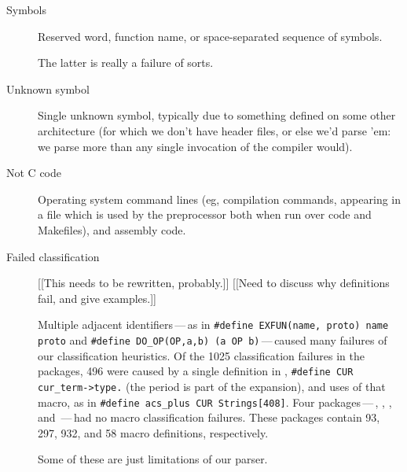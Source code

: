 \begin{description}
\item[Symbols]  Reserved word, function name, or space-separated sequence
of symbols.

The latter is really a failure of sorts.

\item[Unknown symbol]  Single unknown symbol, typically due to something
defined on some other architecture (for which we don't have header files,
or else we'd parse 'em:  we parse more than any single invocation of the
compiler would).


\item[Not C code]  Operating system command lines (eg, compilation
commands, appearing in a file which is used by the preprocessor both when
run over code and Makefiles), and assembly code.







\item[Failed classification]

  [[This needs to be rewritten, probably.]]
  [[Need to discuss why definitions fail, and give examples.]]

  Multiple adjacent identifiers\,---\,as in
  {\tt \#define EXFUN(name, proto) name proto} and {\tt \#define
  \verb|DO_OP|(OP,a,b) (a OP b)}\,---\,caused many failures of our
  classification heuristics.  Of the 1025 classification failures in the
  {\numpackages} packages, 496 were caused by a single definition in
  , {\tt \#define CUR \verb|cur_term->type.|} (the period is
  part of the expansion), and uses of that macro, as in {\tt \#define
  \verb|acs_plus| CUR Strings[408]}.  Four packages\,---\,,
  , , and \,---\,had no macro
  classification failures.  These packages contain 93, 297, 932, and 58 macro
  definitions, respectively.

  Some of these are just limitations of our parser.



\end{description}
